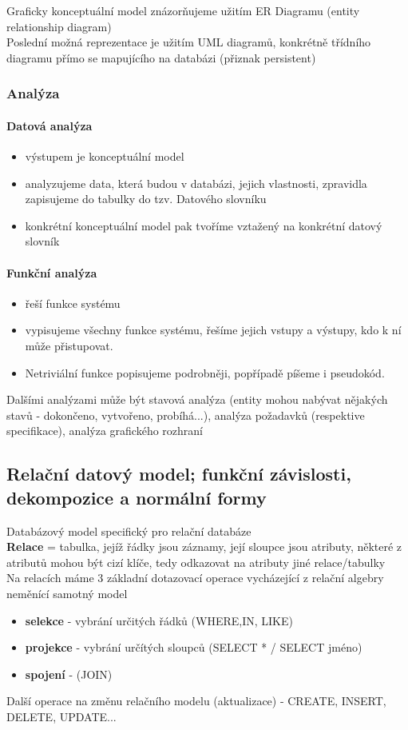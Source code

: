\documentclass[10pt,a4paper]{article}
\begin{document}
Graficky konceptuální model znázorňujeme užitím ER Diagramu (entity relationship diagram) \\
Poslední možná reprezentace je užitím UML diagramů, konkrétně třídního diagramu přímo se mapujícího na databázi (přiznak persistent)
\subsubsection{Analýza}
\paragraph{Datová analýza}
\begin{itemize}
\item výstupem je konceptuální model
\item analyzujeme data, která budou v databázi, jejich vlastnosti, zpravidla zapisujeme do tabulky do tzv. Datového slovníku
\item konkrétní konceptuální model pak tvoříme vztažený na konkrétní datový slovník
\end{itemize}
\paragraph{Funkční analýza}

\begin{itemize}
\item řeší funkce systému
\item vypisujeme všechny funkce systému, řešíme jejich vstupy a výstupy, kdo k ní může přistupovat.
\item Netriviální funkce popisujeme podrobněji, popřípadě píšeme i pseudokód.
\end{itemize}
Dalšími analýzami může být stavová analýza (entity mohou nabývat nějakých stavů - dokončeno, vytvořeno, probíhá...), analýza požadavků (respektive specifikace), analýza grafického rozhraní

\subsection{Relační datový model; funkční závislosti, dekompozice a normální formy}

Databázový model specifický pro relační databáze\\
\textbf{Relace} = tabulka, jejíž řádky jsou záznamy, její sloupce jsou atributy, některé z atributů mohou být cizí klíče, tedy odkazovat na atributy jiné relace/tabulky\\
Na relacích máme 3 základní dotazovací operace vycházející z relační algebry neměnící samotný model
\begin{itemize}
\item \textbf{selekce} - vybrání určitých řádků (WHERE,IN, LIKE)
\item \textbf{projekce} - vybrání určítých sloupců (SELECT * / SELECT jméno)
\item \textbf{spojení} - (JOIN)
\end{itemize}
Další operace na změnu relačního modelu (aktualizace) - CREATE, INSERT, DELETE, UPDATE...
\end{document}

